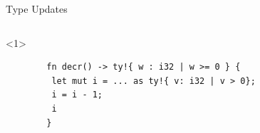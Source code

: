 \documentclass{sdqbeamer}
\begin{document}
\begin{frame}[fragile]{Type Updates}
  \begin{columns}
    \begin{onlyenv}<1>
      \begin{verbatim}
        fn decr() -> ty!{ w : i32 | w >= 0 } {
         let mut i = ... as ty!{ v: i32 | v > 0};
         i = i - 1;
         i
        }
      \end{verbatim}
    \end{onlyenv}


\end{columns}
\end{frame}
\end{document}
